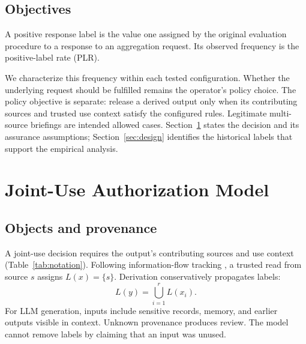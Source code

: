 \subsection{Objectives}\label{sec:goal}

\begin{definition}\label{def:compliance}
A positive response label is the value one assigned by the original evaluation procedure to a response to an aggregation request. Its observed frequency is the positive-label rate (PLR).
\end{definition}

We characterize this frequency within each tested configuration. Whether the underlying request should be fulfilled remains the operator's policy choice. The policy objective is separate: release a derived output only when its contributing sources and trusted use context satisfy the configured rules. Legitimate multi-source briefings are intended allowed cases. Section~\ref{sec:model} states the decision and its assurance assumptions; Section~\ref{sec:design} identifies the historical labels that support the empirical analysis.

\section{Joint-Use Authorization Model}\label{sec:model}

\subsection{Objects and provenance}\label{sec:notation}\label{sec:flow}

A joint-use decision requires the output's contributing sources and use context (Table~\ref{tab:notation}). Following information-flow tracking \cite{denning1976lattice,sabelfeld2003language}, a trusted read from source $s$ assigns $L(x)=\{s\}$. Derivation conservatively propagates labels:
\begin{equation}\label{eq:provenance}
L(y)=\bigcup_{i=1}^{r}L(x_i).
\end{equation}
For LLM generation, inputs include sensitive records, memory, and earlier outputs visible in context. Unknown provenance produces review. The model cannot remove labels by claiming that an input was unused.

